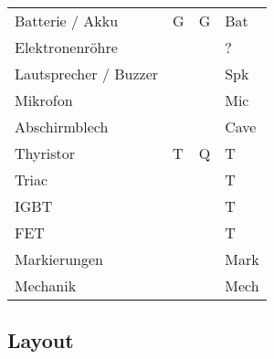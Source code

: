 \begin{table}[h!]
\begin{tabular}{llll}
  \rowcolor{lgray}  Batterie / Akku         & G             & G                 & Bat \\
  \rowcolor{white}  Elektronenröhre         &               &                   & ? \\
  \rowcolor{lgray}  Lautsprecher / Buzzer   &               &                   & Spk \\
  \rowcolor{white}  Mikrofon                &               &                   & Mic \\
  \rowcolor{lgray}  Abschirmblech           &               &                   & Cave \\
  \rowcolor{white}  Thyristor               & T             & Q                 & T \\
  \rowcolor{lgray}  Triac                   &               &                   & T \\
  \rowcolor{white}  IGBT                    &               &                   & T \\
  \rowcolor{lgray}  FET                     &               &                   & T \\
  \rowcolor{white}  Markierungen            &               &                   & Mark \\
  \rowcolor{lgray}  Mechanik                &               &                   & Mech
  \end{tabular}
\end{table}

\subsection{Layout}